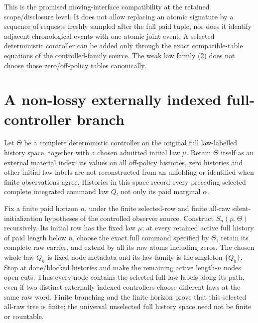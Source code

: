 \documentclass[11pt]{article}\usepackage{amsmath,amssymb,amsthm,geometry}\geometry{margin=1in}
\begin{document}
This is the promised moving-interface compatibility at the retained scope/disclosure level. It does not allow replacing an atomic signature by a sequence of requests freshly sampled after the full paid tuple, nor does it identify adjacent chronological events with one atomic joint event. A selected deterministic controller can be added only through the exact compatible-table equations of the controlled-family source. The weak law family (2) does not choose those zero/off-policy tables canonically.


\section{A non-lossy externally indexed full-controller branch}
Let $\Theta$ be a complete deterministic controller on the original full law-labelled history space, together with a chosen admitted initial law $\mu$. Retain $\Theta$ itself as an external material index: its values on all off-policy histories, zero histories and other initial-law labels are not reconstructed from an unfolding or identified when finite observations agree. Histories in this space record every preceding selected complete integrated command law $Q$, not only its paid marginal $\alpha$.

Fix a finite paid horizon $n$, under the finite selected-row and finite all-raw silent-initialization hypotheses of the controlled observer source. Construct $S_n(\mu,\Theta)$ recursively. Its initial row has the fixed law $\mu$; at every retained active full history of paid length below $n$, choose the exact full command specified by $\Theta$, retain its complete raw carrier, and extend by all its raw atoms including zeros. The chosen whole law $Q_h$ is fixed node metadata and its law family is the singleton $\{Q_h\}$. Stop at done/blocked histories and make the remaining active length-$n$ nodes open cuts. Thus every node contains the selected full law labels along its path, even if two distinct externally indexed controllers choose different laws at the same raw word. Finite branching and the finite horizon prove that this selected all-raw tree is finite; the universal unselected full history space need not be finite or countable.
\end{document}
